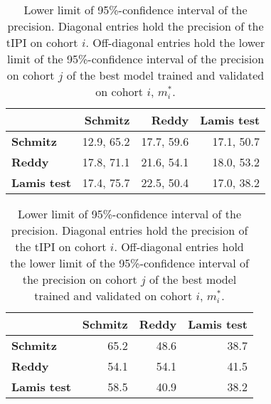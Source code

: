 \begin{table}
    \centering
    \begin{subtable}{\textwidth}
        \centering
        \begin{tabular}{lrrr}
            \hline
            & \textbf{Schmitz} & \textbf{Reddy} & \textbf{Lamis test} \\
            \hline
            \textbf{Schmitz} & \num{12.9}, \num{65.2} & \num{17.7}, \num{59.6} & \num{17.1}, \num{50.7} \\
            \textbf{Reddy} & \num{17.8}, \num{71.1} & \num{21.6}, \num{54.1} & \num{18.0}, \num{53.2} \\
            \textbf{Lamis test} & \num{17.4}, \num{75.7} & \num{22.5}, \num{50.4} & \num{17.0}, \num{38.2} \\
            \hline
        \end{tabular}
        \caption{Prevalence and precision.
            Diagonal entries $(i, i)$ hold prevalence, precision of the $\text{tIPI}$ on 
            cohort $i$. Off-diagonal entries $(i, j)$ hold prevalence, precision on cohort $j$ of 
            the best model trained and validated on cohort $i$, $m_i^*$.}\label{subtab:inter-prev-prec}
    \end{subtable}

    \vspace{0.5cm}
    \begin{subtable}{\textwidth}
        \centering
        \begin{tabular}{lrrr}
            \hline
            & \textbf{Schmitz} & \textbf{Reddy} & \textbf{Lamis test} \\
            \hline
            \textbf{Schmitz} & \num{65.2} & \num{48.6} & \num{38.7} \\
            \textbf{Reddy} & \num{54.1} & \num{54.1} & \num{41.5} \\
            \textbf{Lamis test} & \num{58.5} & \num{40.9} & \num{38.2} \\
            \hline
        \end{tabular}
        \caption{Lower limit of \num{95}\%-confidence interval of the precision.
            Diagonal entries hold the precision of the $\text{tIPI}$ on cohort $i$. Off-diagonal 
            entries hold the lower limit of the \num{95}\%-confidence interval of the precision on 
            cohort $j$ of the best model trained and validated on cohort $i$, $m_i^*$.}
            \label{subtab:inter-prec-ci}
    \end{subtable}


\end{table}
